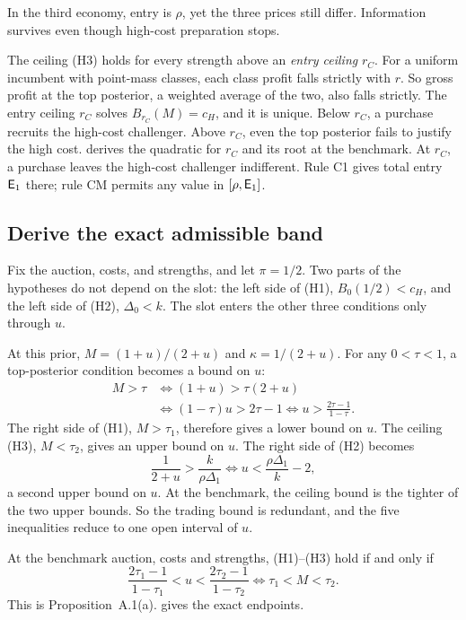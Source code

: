 In the third economy, entry is $\rho$, yet the three prices still differ.
Information survives even though high-cost preparation stops.

The ceiling (H3) holds for every strength above an \emph{entry ceiling} $r_C$.
For a uniform incumbent with point-mass classes, each class profit falls strictly with $r$.
So gross profit at the top posterior, a weighted average of the two, also falls strictly.
The entry ceiling $r_C$ solves $B_{r_C}(M)=c_H$, and it is unique.
Below $r_C$, a purchase recruits the high-cost challenger.
Above $r_C$, even the top posterior fails to justify the high cost.
 derives the quadratic for $r_C$ and its root at the benchmark.
At $r_C$, a purchase leaves the high-cost challenger indifferent.
Rule C1 gives total entry $\mathsf{E}_1$ there; rule CM permits any value in $[\rho,\mathsf{E}_1]$.

\subsection{Derive the exact admissible band}
\label{sec:06_main_result-band}

Fix the auction, costs, and strengths, and let $\pi=1/2$.
Two parts of the hypotheses do not depend on the slot: the left side of (H1), $B_0(1/2)<c_H$, and the left side of (H2), $\Delta_0<k$.
The slot enters the other three conditions only through $u$.

At this prior, $M=(1+u)/(2+u)$ and $\kappa=1/(2+u)$.
For any $0<\tau<1$, a top-posterior condition becomes a bound on $u$:
\begin{align*}
M>\tau
&\iff (1+u)>\tau(2+u)\\
&\iff (1-\tau)u>2\tau-1
\iff u>\frac{2\tau-1}{1-\tau}.
\end{align*}
The right side of (H1), $M>\tau_1$, therefore gives a lower bound on $u$.
The ceiling (H3), $M<\tau_2$, gives an upper bound on $u$.
The right side of (H2) becomes
\[
\frac1{2+u}>\frac{k}{\rho\Delta_1}
\iff u<\frac{\rho\Delta_1}{k}-2,
\]
a second upper bound on $u$.
At the benchmark, the ceiling bound is the tighter of the two upper bounds.
So the trading bound is redundant, and the five inequalities reduce to one open interval of $u$.
\begin{resultbox}
At the benchmark auction, costs and strengths, (H1)--(H3) hold if and only if
\[
\frac{2\tau_1-1}{1-\tau_1}<u<\frac{2\tau_2-1}{1-\tau_2}
\iff \tau_1<M<\tau_2.
\]
This is Proposition~A.1(a). 
 gives the exact endpoints.
\end{resultbox}


